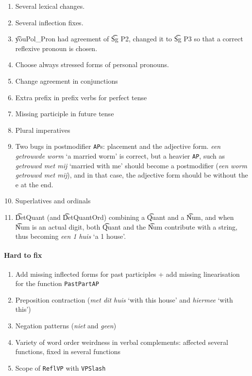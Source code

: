 \begin{enumerate}
\def\labelenumi{\arabic{enumi}.}
\itemsep1pt\parskip0pt
\item
  Several lexical changes.
\item
  Several inflection fixes.
\item
  \t{youPol\_Pron} had agreement of \t{Sg P2}, changed it to \t{Sg P3} so that a
  correct reflexive pronoun is chosen.
\item
  Choose always stressed forms of personal pronouns.
\item
  Change agreement in conjunctions
\item
  Extra prefix in prefix verbs for perfect tense
\item
  Missing participle in future tense
\item
  Plural imperatives
\item Two bugs in postmodifier \texttt{AP}s: placement and the
  adjective form. \emph{een getrouwde worm} `a married worm' is
  correct, but a heavier \texttt{AP}, such as \emph{getrouwd met mij}
  `married with me' should become a postmodifier (\emph{een worm
    getrouwd met mij}), and in that case, the adjective form should be
  without the e at the end.
\item
  Superlatives and ordinals
\item \t{DetQuant} (and \t{DetQuantOrd}) combining a \t{Quant} and a
  \t{Num}, and when \t{Num} is an actual digit, both \t{Quant} and the \t{Num}
  contribute with a string, thus becoming \emph{een 1 huis} `a 1
  house'.
\end{enumerate}

\paragraph{Hard to fix}

\begin{enumerate}
\def\labelenumi{\arabic{enumi}.}
\itemsep1pt\parskip0pt
\item
  Add missing inflected forms for past participles + add missing
  linearisation for the function \texttt{PastPartAP}
\item
  Preposition contraction (\emph{met dit huis} `with this house' and
  \emph{hiermee} `with this')
\item
  Negation patterns (\emph{niet} and \emph{geen})
\item
  Variety of word order weirdness in verbal complements: affected
  several functions, fixed in several functions
\item
  Scope of \texttt{ReflVP} with \texttt{VPSlash}
\end{enumerate}

